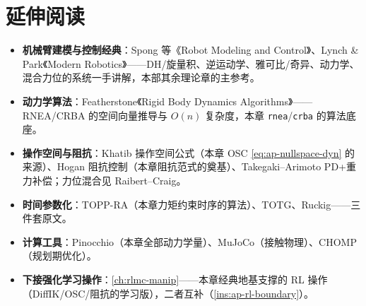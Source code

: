 \section*{延伸阅读}
\begin{itemize}
  \item \textbf{机械臂建模与控制经典}：Spong 等《Robot Modeling and Control》\cite{spong2006robot}、Lynch \& Park《Modern Robotics》\cite{lynch2017modern}——DH/旋量积、逆运动学、雅可比/奇异、动力学、混合力位的系统一手讲解，本部其余理论章的主参考。
  \item \textbf{动力学算法}：Featherstone《Rigid Body Dynamics Algorithms》\cite{featherstone2008rbda}——RNEA/CRBA 的空间向量推导与 $O(n)$ 复杂度，本章 \texttt{rnea}/\allowbreak\texttt{crba} 的算法底座。
  \item \textbf{操作空间与阻抗}：Khatib 操作空间公式\cite{khatib1987operational}（本章 OSC \cref{eq:ap-nullspace-dyn} 的来源）、Hogan 阻抗控制\cite{hogan1985impedance}（本章阻抗范式的奠基）、Takegaki--Arimoto PD+重力补偿\cite{takegaki1981feedback}；力位混合见 Raibert--Craig\cite{raibert1981hybrid}。
  \item \textbf{时间参数化}：TOPP-RA\cite{pham2018toppra}（本章力矩约束时序的算法）、TOTG\cite{kunz2012totg}、Ruckig\cite{berscheid2021ruckig}——三件套原文。
  \item \textbf{计算工具}：Pinocchio\cite{carpentier2019pinocchio}（本章全部动力学量）、MuJoCo\cite{todorov2012mujoco}（接触物理）、CHOMP\cite{zucker2013chomp}（规划期优化）。
  \item \textbf{下接强化学习操作}：\cref{ch:rlmc-manip}——本章经典地基支撑的 RL 操作（DiffIK/OSC/阻抗的学习版），二者互补（\cref{ins:ap-rl-boundary}）。
\end{itemize}


